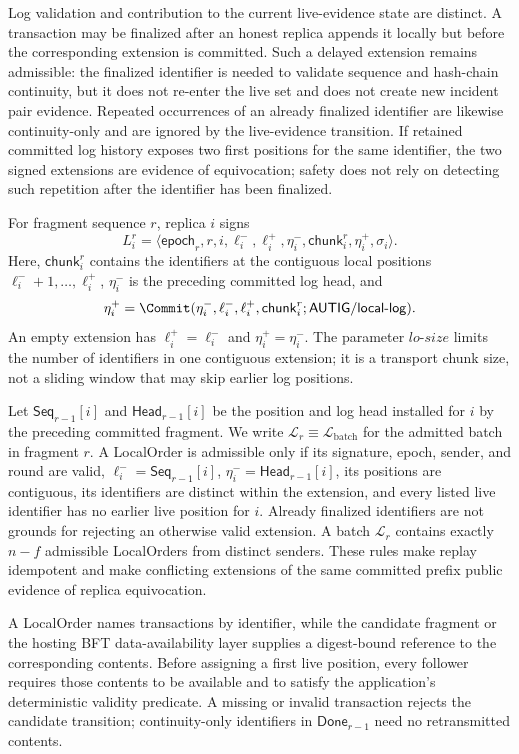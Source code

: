 Log validation and contribution to the current live-evidence state are
distinct.  A transaction may be finalized after an honest replica appends it
locally but before the corresponding extension is committed.  Such a delayed
extension remains admissible: the finalized identifier is needed to validate
sequence and hash-chain continuity, but it does not re-enter the live set and
does not create new incident pair evidence.  Repeated occurrences of an
already finalized identifier are likewise continuity-only and are ignored by
the live-evidence transition.  If retained committed log history exposes two
first positions for the same identifier, the two signed extensions are
evidence of equivocation; safety does not rely on detecting such repetition
after the identifier has been finalized.

For fragment sequence $r$, replica $i$ signs
\[
 L_i^r=\langle \mathsf{epoch}_r,r,i,\ell_i^{-},\ell_i^{+},
 \eta_i^{-},\mathsf{chunk}_i^r,\eta_i^{+},\sigma_i\rangle.
\]
Here, $\mathsf{chunk}_i^r$ contains the identifiers at the contiguous local
positions $\ell_i^{-}+1,\ldots,\ell_i^{+}$,
$\eta_i^{-}$ is the preceding committed log head, and
\[
 \eta_i^{+}=\Commit(\eta_i^{-},\ell_i^{-},\ell_i^{+},
              \mathsf{chunk}_i^r;\mathsf{AUTIG/local\mbox{-}log}).
\]
An empty extension has $\ell_i^{+}=\ell_i^{-}$ and
$\eta_i^{+}=\eta_i^{-}$.  The parameter $lo\text{-}size$ limits the number of
identifiers in one contiguous extension; it is a transport chunk size, not a
sliding window that may skip earlier log positions.

Let $\mathsf{Seq}_{r-1}[i]$ and $\mathsf{Head}_{r-1}[i]$ be the position and
log head installed for $i$ by the preceding committed fragment.  We write
$\mathcal L_r\equiv\mathcal L_{\mathrm{batch}}$ for the admitted batch in
fragment $r$.  A LocalOrder
is admissible only if its signature, epoch, sender, and round are valid,
$\ell_i^{-}=\mathsf{Seq}_{r-1}[i]$,
$\eta_i^{-}=\mathsf{Head}_{r-1}[i]$, its positions are contiguous, its
identifiers are distinct within the extension, and every listed live
identifier has no earlier live position for $i$.  Already finalized
identifiers are not grounds for rejecting an otherwise valid extension.  A
batch $\mathcal L_r$ contains exactly $n-f$ admissible LocalOrders from
distinct senders.  These rules make replay idempotent and make conflicting
extensions of the same committed prefix public evidence of replica
equivocation.

A LocalOrder names transactions by identifier, while the candidate fragment
or the hosting BFT data-availability layer supplies a digest-bound reference to
the corresponding contents.  Before assigning a first live position, every
follower requires those contents to be available and to satisfy the
application's deterministic validity predicate.  A missing or invalid
transaction rejects the candidate transition; continuity-only identifiers in
$\mathsf{Done}_{r-1}$ need no retransmitted contents.

